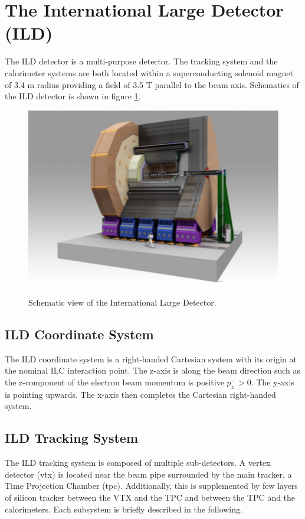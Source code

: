 \section{The International Large Detector (ILD)}
\label{sec:ILD}

The ILD detector is a multi-purpose detector. The tracking system and the calorimeter systems are both located within a superconducting solenoid magnet of 3.4 m radius providing a field of 3.5 T parallel to the beam axis. Schematics of the ILD detector is shown in figure \ref{fig:ILD}.

\begin{figure}[htbp!]
  \centering
  \includegraphics[width=0.7\linewidth]{chap2/fig/ILD_full.png}
  \caption{Schematic view of the International Large Detector. \cite{ILC_TDR_Vol4}} \label{fig:ILD}
\end{figure}

\subsection{ILD Coordinate System}

The ILD coordinate system \cite{ILDCoordinates} is a right-handed Cartesian system with its origin at the nominal ILC interaction point. The z-axis is along the beam direction such as the z-component of the electron beam momentum is positive $p^-_z > 0$. The y-axis is pointing upwards. The x-axis then completes the Cartesian right-handed system.

\subsection{ILD Tracking System}

The ILD tracking system is composed of multiple sub-detectors. A vertex detector (\acrshort{vtx}) is located near the beam pipe surrounded by the main tracker, a Time Projection Chamber (\acrshort{tpc}). Additionally, this is supplemented by few layers of silicon tracker between the VTX and the TPC and between the TPC and the calorimeters. Each subsystem is briefly described in the following.

